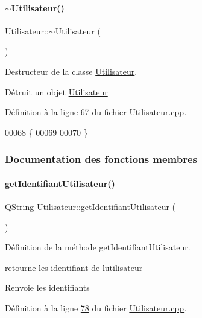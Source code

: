 \paragraph{\texorpdfstring{$\sim$\+Utilisateur()}{~Utilisateur()}}
{\footnotesize\ttfamily Utilisateur\+::$\sim$\+Utilisateur (\begin{DoxyParamCaption}{ }\end{DoxyParamCaption})}



Destructeur de la classe \hyperlink{class_utilisateur}{Utilisateur}. 

Détruit un objet \hyperlink{class_utilisateur}{Utilisateur} 

Définition à la ligne \hyperlink{_utilisateur_8cpp_source_l00067}{67} du fichier \hyperlink{_utilisateur_8cpp_source}{Utilisateur.\+cpp}.


\begin{DoxyCode}
00068 \{
00069 
00070 \}
\end{DoxyCode}


\subsubsection{Documentation des fonctions membres}
\mbox{\label{class_utilisateur_af944ac02cca7914480e20f46c4dd0e56}} 
\paragraph{\texorpdfstring{get\+Identifiant\+Utilisateur()}{getIdentifiantUtilisateur()}}
{\footnotesize\ttfamily Q\+String Utilisateur\+::get\+Identifiant\+Utilisateur (\begin{DoxyParamCaption}{ }\end{DoxyParamCaption})}



Définition de la méthode get\+Identifiant\+Utilisateur. 

retourne les identifiant de l\textquotesingle{}utilisateur \begin{DoxyReturn}{Renvoie}
les identifiants 
\end{DoxyReturn}


Définition à la ligne \hyperlink{_utilisateur_8cpp_source_l00078}{78} du fichier \hyperlink{_utilisateur_8cpp_source}{Utilisateur.\+cpp}.



